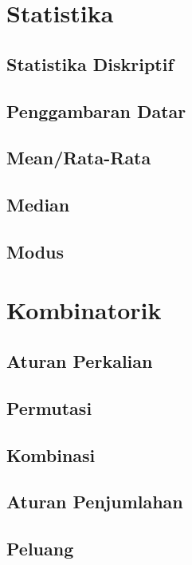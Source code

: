 \documentclass[12pt,a4paper,twoside,openany]{book}
\begin{document}
\chapter{Statistika}
\section{Statistika Diskriptif}
\section{Penggambaran Datar}
\section{Mean/Rata-Rata}
\section{Median}
\section{Modus}

\chapter{Kombinatorik}
\section{Aturan Perkalian}

	

\section{Permutasi}
\section{Kombinasi}
\section{Aturan Penjumlahan}
\section{Peluang}







	
\end{document}
